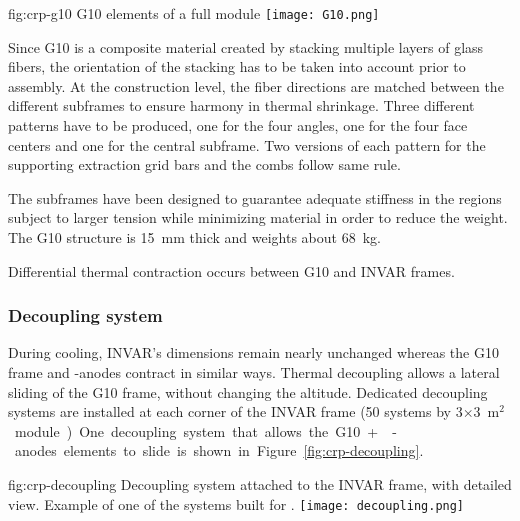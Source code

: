 \begin{dunefigure}{fig:crp-g10}
{G10 elements of a full  module}
\texttt{[image: G10.png]}
\end{dunefigure}

Since G10 is a composite material created by stacking multiple layers of glass fibers,  the orientation of the stacking has to be taken into account prior to assembly.
At the construction level, the fiber directions are matched between the different subframes to ensure harmony in thermal shrinkage. Three different patterns have to be produced, one for the four angles, one for the four face centers and one for the central subframe.
Two versions of each pattern for the supporting extraction grid bars and the combs follow same rule.

The subframes have been designed to guarantee %
adequate stiffness in the  regions subject to larger tension while minimizing material in order to reduce the weight.
The G10 structure is \SI{15}{mm} thick and weights about \SI{68}{kg}. 

Differential thermal contraction occurs between G10 and INVAR frames.

\subsubsection{Decoupling system}
During cooling, INVAR's dimensions remain nearly unchanged whereas the G10 frame and -anodes contract in similar ways. Thermal decoupling allows a lateral sliding of the G10 frame, without changing the altitude. 
Dedicated decoupling systems are installed at each corner of the INVAR frame (\num{50} systems by  \num{3}$\times$\SI{3}{m$^{2}$} module). One decoupling system that allows the G10+ -anodes elements to slide is shown in  Figure~\ref{fig:crp-decoupling}.

\begin{dunefigure}{fig:crp-decoupling}
{Decoupling system attached to the INVAR frame, with detailed view. Example of one of the systems built for .}
\texttt{[image: decoupling.png]}
\end{dunefigure}

